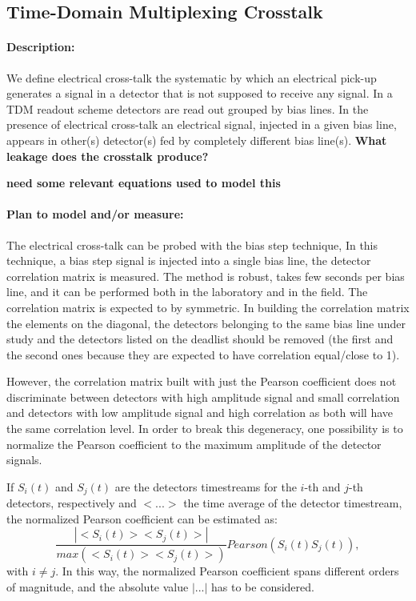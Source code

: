 \subsection{Time-Domain Multiplexing Crosstalk}

\paragraph{Description:}
We define electrical cross-talk the systematic by which an electrical pick-up generates a signal in a detector that is not supposed to receive any signal. In a TDM readout scheme detectors are read out grouped by bias lines. In the presence of electrical cross-talk an electrical signal, injected in a given bias line, appears in other(s) detector(s) fed by completely different bias line(s). \textbf{What leakage does the crosstalk produce?}

\textbf{need some relevant equations used to model this}

\paragraph{Plan to model and/or measure:}
The electrical cross-talk can be probed with the bias step technique, In this technique, a bias step signal is injected into a single bias line, the detector correlation matrix is measured. The method is robust, takes few seconds per bias line, and it can be performed both in the laboratory and in the field. The correlation matrix is expected to by symmetric. In building the correlation matrix the elements on the diagonal, the detectors belonging to the same bias line under study and the detectors listed on the deadlist should be removed (the first and the second ones because they are expected to have correlation equal/close to 1).

However, the correlation matrix built with just the Pearson coefficient does not discriminate between detectors with high amplitude signal and small correlation and detectors with low amplitude signal and high correlation as both will have the same correlation level. In order to break this degeneracy, one possibility is to normalize the Pearson coefficient to the maximum amplitude of the detector signals. 

If $S_{i}(t)$ and $S_{j}(t)$ are the detectors timestreams for the $i$-th and $j$-th detectors, respectively and $< ...>$ the time average of the detector timestream, the normalized Pearson coefficient can be estimated as:
\begin{equation}\label{Pearson}
  \frac{|<S_{i}(t)> <S_{j}(t)>|}{max(<S_{i}(t)> <S_{j}(t)>)} Pearson(S_{i}(t) S_{j}(t)),
\end{equation}
with $i \neq j$.
In this way, the normalized Pearson coefficient spans different orders of magnitude, and the absolute value $|...|$ has to be considered. 

